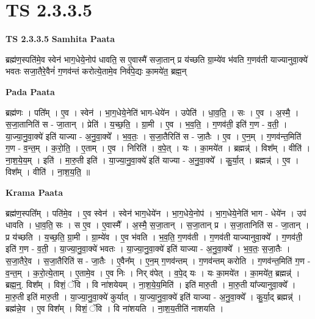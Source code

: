 \documentclass[17pt]{extarticle}
\begin{document}
\section{ TS 2.3.3.5 }

\textbf{TS 2.3.3.5 } \newline
\textbf{Samhita Paata} \newline

ब्रह्म॑ण॒स्पति॑मे॒व स्वेन॑ भाग॒धेये॒नोप॑ धावति॒ स ए॒वास्मै॑ सजा॒तान् प्र य॑च्छति ग्रा॒म्ये॑व भ॑वति ग॒णव॑ती याज्यानुवा॒क्ये॑ भवतः सजा॒तैरे॒वैनं॑ ग॒णव॑न्तं करोत्ये॒तामे॒व निर्व॑पे॒द्यः का॒मये॑त॒ ब्रह्म॒न् \newline

\textbf{Pada Paata} \newline

ब्रह्म॑णः । पति᳚म् । ए॒व । स्वेन॑ । भा॒ग॒धेये॒नेति॑ भाग-धेये॑न । उपेति॑ । धा॒व॒ति॒ । सः । ए॒व । अ॒स्मै॒ । स॒जा॒तानिति॑ स - जा॒तान् । प्रेति॑ । य॒च्छ॒ति॒ । ग्रा॒मी । ए॒व । भ॒व॒ति॒ । ग॒णव॑ती॒ इति॑ ग॒ण - व॒ती॒ । या॒ज्या॒नु॒वा॒क्ये॑ इति॑ याज्या - अ॒नु॒वा॒क्ये᳚ । भ॒व॒तः॒ । स॒जा॒तैरिति॑ स - जा॒तैः । ए॒व । ए॒न॒म् । ग॒णव॑न्त॒मिति॑ ग॒ण - व॒न्त॒म् । क॒रो॒ति॒ । ए॒ताम् । ए॒व । निरिति॑ । व॒पे॒त् । यः । का॒मये॑त । ब्रह्मन्न्॑ । विश᳚म् । वीति॑ । ना॒श॒ये॒य॒म् । इति॑ । मा॒रु॒ती इति॑ । या॒ज्या॒नु॒वा॒क्ये॑ इति॑ याज्या - अ॒नु॒वा॒क्ये᳚ । कु॒र्या॒त् । ब्रह्मन्न्॑ । ए॒व । विश᳚म् । वीति॑ । ना॒श॒य॒ति॒ ॥  \newline


\textbf{Krama Paata} \newline

ब्रह्म॑ण॒स्पति᳚म् । पति॑मे॒व । ए॒व स्वेन॑ । स्वेन॑ भाग॒धेये॑न । भा॒ग॒धेये॒नोप॑ । भा॒ग॒धेये॒नेति॑ भाग - धेये॑न । उप॑ धावति । धा॒व॒ति॒ सः । स ए॒व । ए॒वास्मै᳚ । अ॒स्मै॒ स॒जा॒तान् । स॒जा॒तान् प्र । स॒जा॒तानिति॑ स - जा॒तान् । प्र य॑च्छति । य॒च्छ॒ति॒ ग्रा॒मी । ग्रा॒म्ये॑व । ए॒व भ॑वति । भ॒व॒ति॒ ग॒णव॑ती । ग॒णव॑ती याज्यानुवा॒क्ये᳚ । ग॒णव॑ती॒ इति॑ ग॒ण - व॒ती॒ । या॒ज्या॒नु॒वा॒क्ये॑ भवतः । या॒ज्या॒नु॒वा॒क्ये॑ इति॑ याज्या - अ॒नु॒वा॒क्ये᳚ । भ॒व॒तः॒ स॒जा॒तैः । स॒जा॒तैरे॒व । स॒जा॒तैरिति॑ स - जा॒तैः । ए॒वैन᳚म् । ए॒न॒म् ग॒णव॑न्तम् । ग॒णव॑न्तम् करोति । ग॒णव॑न्त॒मिति॑ ग॒ण - व॒न्त॒म् । क॒रो॒त्ये॒ताम् । ए॒तामे॒व । ए॒व निः । निर् व॑पेत् । व॒पे॒द् यः । यः का॒मये॑त । का॒मये॑त॒ ब्रह्मन्न्॑ । ब्रह्म॒न्॒. विश᳚म् । विशं॒ ॅवि । वि ना॑शयेयम् । ना॒श॒ये॒य॒मिति॑ । इति॑ मारु॒ती । मा॒रु॒ती या᳚ज्यानुवा॒क्ये᳚ । मा॒रु॒ती इति॑ मारु॒ती । या॒ज्या॒नु॒वा॒क्ये॑ कुर्यात् । या॒ज्या॒नु॒वा॒क्ये॑ इति॑ याज्या - अ॒नु॒वा॒क्ये᳚ । कु॒र्या॒द् ब्रह्मन्न्॑ । ब्रह्म॑न्ने॒व । ए॒व विश᳚म् । विशं॒ ॅवि । वि ना॑शयति । ना॒श॒य॒तीति॑ नाशयति । \newline
\end{document}
